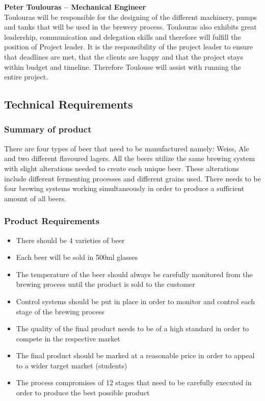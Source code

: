 \noindent
\textbf{Peter Toulouras – Mechanical Engineer}\\
\noindent
Toulouras will be responsible for the designing of the different machinery, pumps and tanks that will be used in the brewery process. Toulouras also exhibits great leadership, communication and delegation skills and therefore will fulfill the position of Project leader. It is the responsibility of the project leader to ensure that deadlines are met, that the clients are happy and that the project stays within budget and timeline. Therefore Toulouse will assist with running the entire project.


\subsection{Technical Requirements}
\subsubsection{Summary of product}

There are four types of beer that need to be manufactured namely: Weiss, Ale and two different flavoured lagers. All the beers utilize the same brewing system with slight alterations needed to create each unique beer. These alterations include different fermenting processes and different grains used. There needs to be four brewing systems working simultaneously in order to produce a sufficient amount of all beers. 

\subsubsection{Product Requirements}

\begin{itemize}
\item There should be 4 varieties of beer
\item Each beer will be sold in 500ml glasses
\item The temperature of the beer should always be carefully monitored from the brewing process until the product is sold to the customer 
\item Control systems should be put in place in order to monitor and control each stage of the brewing process 
\item The quality of the final product needs to be of a high standard in order to compete in the respective market 
\item The  final product should be marked at a reasonable price in order to appeal to a wider target market (students)
\item The process compromises of 12 stages that need to be carefully executed in order to produce the best possible product 
\end{itemize}
